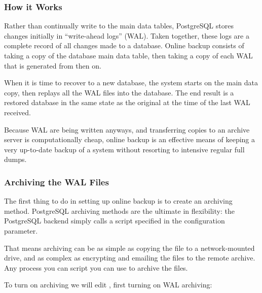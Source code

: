 \documentclass[a4paper,11pt,english]{sphinxmanual}
\begin{document}
\subsubsection{How it Works}
\label{\detokenize{maintenance:how-it-works}}
Rather than continually write to the main data tables, PostgreSQL stores changes initially in “write-ahead logs” (WAL). Taken together, these logs are a complete record of all changes made to a database.  Online backup consists of taking a copy of the database main data table, then taking a copy of each WAL that is generated from then on.

\noindent{}

When it is time to recover to a new database, the system starts on the main data copy, then replays all the WAL files into the database. The end result is a restored database in the same state as the original at the time of the last WAL received.

Because WAL are being written anyways, and transferring copies to an archive server is computationally cheap, online backup is an effective means of keeping a very up-to-date backup of a system without resorting to intensive regular full dumps.


\subsubsection{Archiving the WAL Files}
\label{\detokenize{maintenance:archiving-the-wal-files}}
The first thing to do in setting up online backup is to create an archiving method. PostgreSQL archiving methods are the ultimate in flexibility: the PostgreSQL backend simply calls a script specified in the  configuration parameter.

That means archiving can be as simple as copying the file to a network-mounted drive, and as complex as encrypting and emailing the files to the remote archive. Any process you can script you can use to archive the files.

To turn on archiving we will edit , first turning on WAL archiving:

\begin{sphinxVerbatim}[commandchars=\\\{\}]
  
  
\end{sphinxVerbatim}
\end{document}
